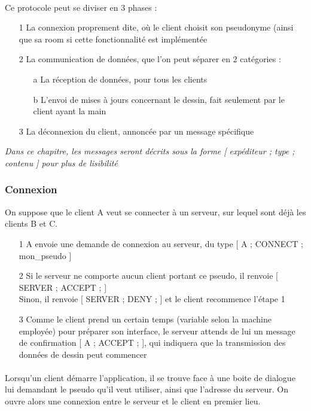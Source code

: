 \documentclass[a4paper,11pt]{article}
\begin{document}
\paragraph{}Ce protocole peut se diviser en 3 phases : 
\begin{itemize}
	\item[1] La connexion proprement dite, où le client choisit son pseudonyme (ainsi que sa room si cette fonctionnalité est implémentée
	\item[2] La communication de données, que l'on peut séparer en 2 catégories :
	\begin{itemize}
		\item[a] La réception de données, pour tous les clients
		\item[b] L'envoi de mises à jours concernant le dessin, fait seulement par le client ayant la main
	\end{itemize}
	\item[3] La déconnexion du client, annoncée par un message spécifique
\end{itemize}

\textit{Dans ce chapitre, les messages seront décrits sous la forme [ expéditeur ; type ; contenu ] pour plus de lisibilité}

\subsubsection{Connexion}
On suppose que le client A veut se connecter à un serveur, sur lequel sont déjà les clients B et C.
\begin{itemize}
	\item[1] A envoie une demande de connexion au serveur, du type [ A ; CONNECT ; mon\_pseudo ]
	\item[2] Si le serveur ne comporte aucun client portant ce pseudo, il renvoie [ SERVER ; ACCEPT ; ] \\
	Sinon, il renvoie [ SERVER ; DENY ; ] et le client recommence l'étape 1
	\item[3] Comme le client prend un certain temps (variable selon la machine employée) pour préparer son interface, le serveur attends de lui un message de confirmation [ A ; ACCEPT ; ], qui indiquera que la transmission des données de dessin peut commencer
\end{itemize}

\paragraph{}Lorsqu'un client démarre l'application, il se trouve face à une boite de dialogue lui demandant le pseudo qu'il veut utiliser, ainsi que l'adresse du serveur. On ouvre alors une connexion entre le serveur et le client en premier lieu.
\end{document}
